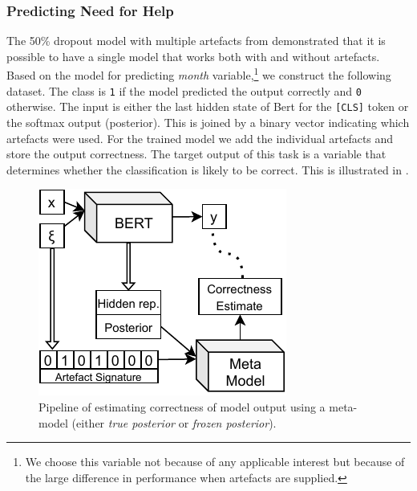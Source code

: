 \subsubsection{Predicting Need for Help} \label{subsubsec:need_help}

The 50\% dropout model with multiple artefacts from  demonstrated that it is possible to have a single model that works both with and without artefacts.
Based on the model for predicting \emph{month} variable,\footnote{We choose this variable not because of any applicable interest but because of the large difference in performance when artefacts are supplied.} we construct the following dataset.
The class is \texttt{1} if the model predicted the output correctly and \texttt{0} otherwise.
The input is either the last hidden state of Bert for the \texttt{[CLS]} token or the softmax output (posterior).
This is joined by a binary vector indicating which artefacts were used.
For the trained model we add the individual artefacts and store the output correctness.
The target output of this task is a variable that determines whether the classification is likely to be correct.
This is illustrated in .

\begin{figure}[ht]
\centering
\includegraphics[width=0.85\linewidth]{img/meta_model.pdf}
\caption{Pipeline of estimating correctness of model output using a meta-model (either \emph{true posterior} or \emph{frozen posterior}).}
\label{fig:meta_model}
\end{figure}


